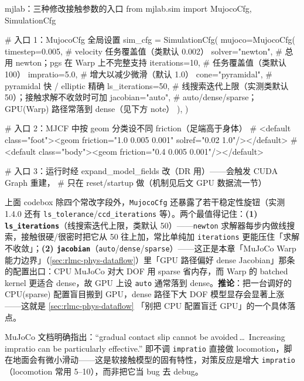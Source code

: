 \begin{codebox}[Python]{mjlab：三种修改接触参数的入口}
from mjlab.sim import MujocoCfg, SimulationCfg

# 入口 1：MujocoCfg 全局设置
sim_cfg = SimulationCfg(
    mujoco=MujocoCfg(
        timestep=0.005,      # velocity 任务覆盖值（类默认 0.002）
        solver="newton",     # 总用 newton；pgs 在 Warp 上不完整支持
        iterations=10,       # 任务覆盖值（类默认 100）
        impratio=5.0,        # 增大以减少微滑（默认 1.0）
        cone="pyramidal",    # pyramidal 快 / elliptic 精确
        ls_iterations=50,    # 线搜索迭代上限（实测类默认 50）；接触求解不收敛时可加
        jacobian="auto",     # auto/dense/sparse；GPU(Warp) 路径常落到 dense（见下方 note）
    ),
)

# 入口 2：MJCF 中按 geom 分类设不同 friction（足端高于身体）
#   <default class="foot"><geom friction="1.0 0.005 0.001" solref="0.02 1.0"/></default>
#   <default class="body"><geom friction="0.4 0.005 0.001"/></default>

# 入口 3：运行时经 expand_model_fields 改（DR 用）——会触发 CUDA Graph 重建，
#   只在 reset/startup 做（机制见后文 GPU 数据流一节）
\end{codebox}

\begin{note}
上面 codebox 除四个常改字段外，\verb|MujocoCfg| 还暴露了若干稳定性旋钮（实测 1.4.0 还有 \verb|ls_tolerance|/\verb|ccd_iterations| 等）。两个最值得记住：\textbf{(1) \texttt{ls\_iterations}}（线搜索迭代上限，类默认 50）——\verb|newton| 求解器每步内做线搜索，接触很硬/很密时把它从 50 往上加，常比单纯加 \verb|iterations| 更能压住「求解不收敛」；\textbf{(2) \texttt{jacobian}}（\verb|auto|/\verb|dense|/\verb|sparse|）——这正是本章「MuJoCo Warp 能力边界」（\cref{sec:rlmc-phys-dataflow}）里「GPU 路径偏好 dense Jacobian」那条的配置出口：CPU MuJoCo 对大 DOF 用 sparse 省内存，而 Warp 的 batched kernel 更适合 dense，故 GPU 上设 \verb|auto| 通常落到 dense。\textbf{推论}：把一台调好的 CPU(sparse) 配置盲目搬到 GPU，dense 路径下大 DOF 模型显存会显著上涨——这就是 \cref{sec:rlmc-phys-dataflow} 「别把 CPU 配置盲迁 GPU」的一个具体落点。
\end{note}

\begin{note}
MuJoCo 文档明确指出：``gradual contact slip cannot be avoided\,\dots\ Increasing impratio can be particularly effective.'' 即不调 \verb|impratio| 直接做 locomotion，脚在地面会有微小滑动——这是软接触模型的固有特性，对策反应是增大 \verb|impratio|（locomotion 常用 5--10），而非把它当 bug 去 debug。
\end{note}

